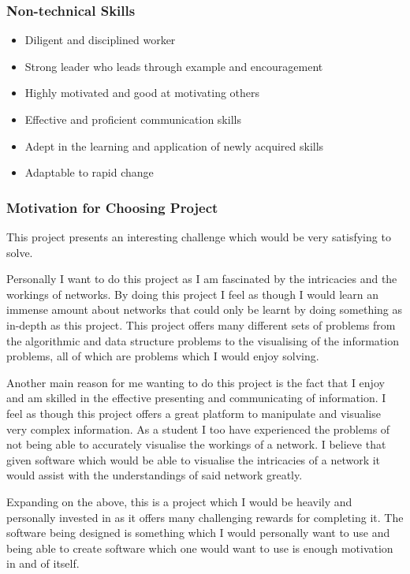 \documentclass{article}
\begin{document}
	\subsubsection{Non-technical Skills}
		\begin{itemize}
			\item Diligent and disciplined worker
			\item Strong leader who leads through example and encouragement
			\item Highly motivated and good at motivating others
			\item Effective and proficient communication skills
			\item Adept in the learning and application of newly acquired skills
			\item Adaptable to rapid change
		\end{itemize}
	\subsubsection{Motivation for Choosing Project}
		This project presents an interesting challenge which would be very satisfying to solve.
		
		Personally I want to do this project as I am fascinated by the intricacies and the workings of networks. By doing this project I feel as though I would learn an immense amount about networks that could only be learnt by doing something as in-depth as this project. This project offers many different sets of problems from the algorithmic and data structure problems to the visualising of the information problems, all of which are problems which I would enjoy solving.
		
		Another main reason for me wanting to do this project is the fact that I enjoy and am skilled in the effective presenting and communicating of information. I feel as though this project offers a great platform to manipulate and visualise very complex information. As a student I too have experienced the problems of not being able to accurately visualise the workings of a network. I believe that given software which would be able to visualise the intricacies of a network it would assist with the understandings of said network greatly.
		
		Expanding on the above, this is a project which I would be heavily and personally invested in as it offers many challenging rewards for completing it. The software being designed is something which I would personally want to use and being able to create software which one would want to use is enough motivation in and of itself.
	
\end{document}
